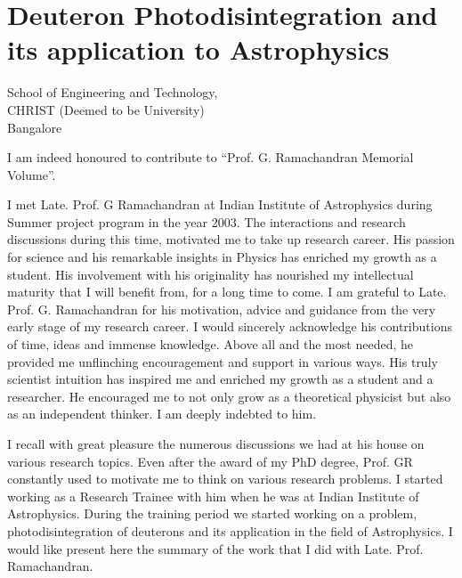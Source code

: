 \chapter[Deuteron Photodisintegration and its application to Astrophysics]{Deuteron Photodisintegration and its application to Astrophysics}\label{chap20}


\begin{center}
School of Engineering and Technology,\\ 
CHRIST (Deemed to be University)\\
Bangalore 
\end{center}

I am indeed honoured to contribute to ``Prof. G. Ramachandran Memorial Volume''. 

I met Late. Prof. G Ramachandran at Indian Institute of Astrophysics during Summer project program in the year 2003. The interactions and research discussions during this time, motivated me to take up research career. His passion for science and his remarkable insights in Physics has enriched my growth as a student. His involvement with his originality has nourished my intellectual maturity that I will benefit from, for a long time to come. I am grateful to Late. Prof. G. Ramachandran for his motivation, advice and guidance from the very early stage of my research career. I would sincerely acknowledge his contributions of time, ideas and immense knowledge. Above all and the most needed, he provided me unflinching encouragement and support in various ways. His truly scientist intuition has inspired me and enriched my growth as a student and a researcher. He encouraged me to not only grow as a theoretical physicist but also as an independent thinker. I am deeply indebted to him.

I  recall with great pleasure the numerous discussions we had at his house on various research topics. Even after the award of my PhD degree, Prof. GR constantly used to motivate me to think on various research problems. I started working as a Research Trainee with him when he was at Indian Institute of Astrophysics. During the training period we started working on a problem, photodisintegration of deuterons and its application in the field of Astrophysics. I would like present here the summary of the work that I did with Late. Prof. Ramachandran.

